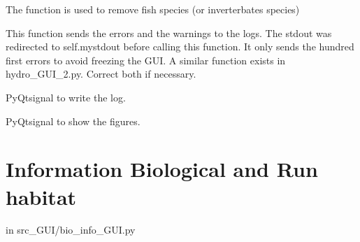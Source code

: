 \documentclass[letterpaper,10pt,english]{sphinxmanual}
\begin{document}
\begin{fulllineitems}
\begin{fulllineitems}
\end{fulllineitems}


\begin{fulllineitems}
\label{\detokenize{index:src_GUI.estimhab_GUI.StatModUseful.remove_fish}}
The function is used to remove fish species (or inverterbates species)

\end{fulllineitems}


\begin{fulllineitems}
\label{\detokenize{index:src_GUI.estimhab_GUI.StatModUseful.send_err_log}}
This function sends the errors and the warnings to the logs.
The stdout was redirected to self.mystdout before calling this function. It only sends the hundred first errors
to avoid freezing the GUI. A similar function exists in hydro\_GUI\_2.py. Correct both if necessary.

\end{fulllineitems}


\begin{fulllineitems}
\label{\detokenize{index:src_GUI.estimhab_GUI.StatModUseful.send_log}}
PyQtsignal to write the log.

\end{fulllineitems}


\begin{fulllineitems}
\label{\detokenize{index:src_GUI.estimhab_GUI.StatModUseful.show_fig}}
PyQtsignal to show the figures.

\end{fulllineitems}


\end{fulllineitems}



\section{Information Biological and Run habitat}
\label{\detokenize{index:information-biological-and-run-habitat}}
in src\_GUI/bio\_info\_GUI.py
\end{document}
